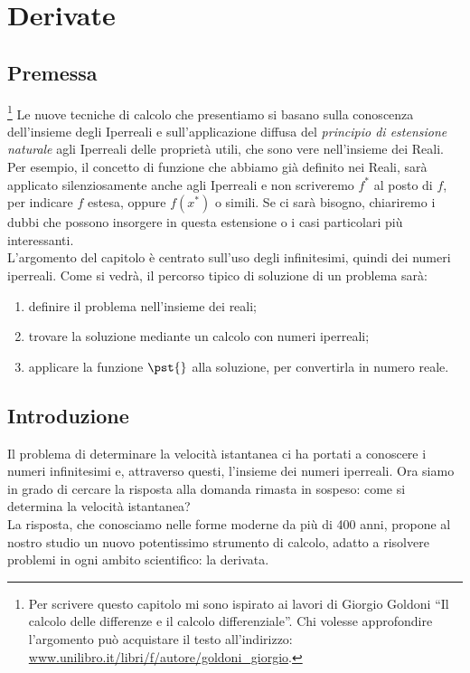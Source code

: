 


\chapter{Derivate}

\section{Premessa}
\footnote{Per scrivere questo capitolo mi sono ispirato 
ai lavori di Giorgio Goldoni ``Il calcolo delle differenze e il calcolo 
differenziale''. 
Chi volesse approfondire l'argomento può acquistare il testo 
all'indirizzo: 
\href{https://www.unilibro.it/libri/f/autore/goldoni\_giorgio}
     {www.unilibro.it/libri/f/autore/goldoni\_giorgio}.}
Le nuove tecniche di calcolo che presentiamo si basano sulla conoscenza 
dell'insieme degli Iperreali e sull'applicazione diffusa del \emph{principio di estensione naturale} agli Iperreali delle proprietà utili, che sono vere nell'insieme dei Reali.\\
Per esempio, il concetto di funzione che abbiamo già definito nei Reali, sarà 
applicato silenziosamente anche agli Iperreali e non scriveremo $f^*$ al posto 
di $f$, per indicare $f$ estesa, oppure $f(x^*)$ o simili. 
Se ci sarà bisogno, chiariremo i dubbi che possono insorgere in questa 
estensione o i casi particolari più interessanti.\\
L'argomento del capitolo è centrato sull'uso degli infinitesimi, quindi dei 
numeri iperreali. Come si vedrà, il percorso tipico di soluzione di un problema 
sarà: 
\begin{enumerate}
\item definire il problema nell'insieme dei reali;
\item trovare la soluzione mediante un calcolo con numeri iperreali;
\item applicare la funzione $\pst{}$ alla soluzione, per convertirla in numero 
reale.
\end{enumerate}

\section{Introduzione}
\label{sec:differenziazione_introduzione}
Il problema di determinare la velocità istantanea ci ha portati a conoscere 
i numeri infinitesimi e, attraverso questi, l'insieme dei numeri iperreali.
Ora siamo in grado di cercare la risposta alla domanda rimasta in sospeso: 
come si determina la velocità istantanea?\\
La risposta, che conosciamo nelle forme moderne da più di 400 anni,
propone al nostro studio un nuovo potentissimo strumento di calcolo, 
adatto a risolvere problemi in ogni ambito scientifico: la derivata.


